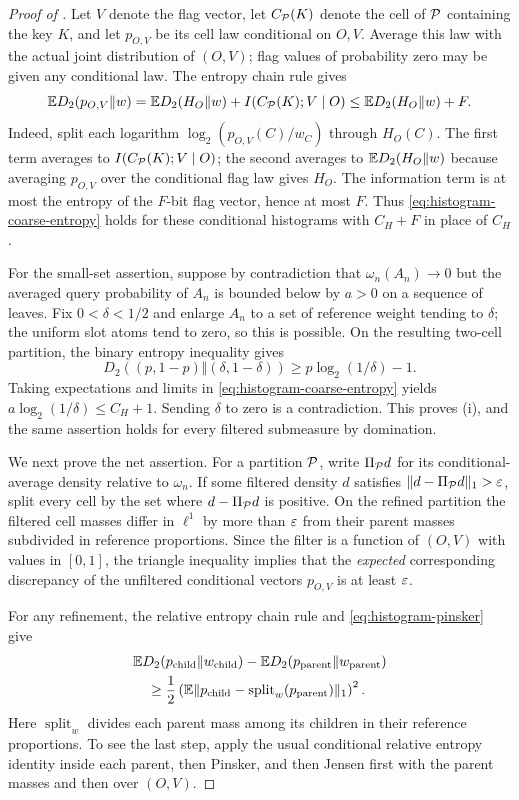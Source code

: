 \begin{proof}[Proof of ]
Let $V$ denote the flag vector, let $C_{\mathcal P}(K)$ denote the cell of
$\mathcal P$ containing the key $K$, and let $p_{O,V}$ be its cell law
conditional on $O,V$. Average this law with the actual joint
distribution of $(O,V)$; flag values of probability zero may be given
any conditional law. The entropy chain rule gives
\[
 \mathbb E D_2(p_{O,V}\Vert w)
 =\mathbb E D_2(H_O\Vert w)+I(C_{\mathcal P}(K);V\mid O)
 \le\mathbb E D_2(H_O\Vert w)+F.
\]
Indeed, split each logarithm $\log_2(p_{O,V}(C)/w_C)$ through
$H_O(C)$. The first term averages to $I(C_{\mathcal P}(K);V\mid O)$; the second
averages to $\mathbb E D_2(H_O\Vert w)$ because averaging $p_{O,V}$ over
the conditional flag law gives $H_O$. The information term is at
most the entropy of the $F$-bit flag vector, hence at most $F$.
Thus \eqref{eq:histogram-coarse-entropy} holds for these conditional
histograms with $C_H+F$ in place of $C_H$.

For the small-set assertion, suppose by contradiction that
$\omega_n(A_n)\to0$ but the averaged query probability of $A_n$ is
bounded below by $a>0$ on a sequence of leaves. Fix $0<\delta<1/2$ and
enlarge $A_n$ to a set of reference weight tending to $\delta$; the
uniform slot atoms tend to zero, so this is possible. On the resulting
two-cell partition, the binary entropy inequality gives
\[
 D_2((p,1-p)\Vert(\delta,1-\delta))
 \ge p\log_2(1/\delta)-1.
\]
Taking expectations and limits in
\eqref{eq:histogram-coarse-entropy} yields
$a\log_2(1/\delta)\le C_H+1$. Sending $\delta$ to zero is a
contradiction. This proves (i), and the same assertion holds for every
filtered submeasure by domination.

We next prove the net assertion. For a partition $\mathcal P$, write
$\Pi_{\mathcal P}d$ for its conditional-average density relative to
$\omega_n$. If some filtered density $d$ satisfies
$\lVert d-\Pi_{\mathcal P}d\rVert_1>\varepsilon$, split every cell by the set where
$d-\Pi_{\mathcal P}d$ is positive. On the refined partition the filtered cell
masses differ in $\ell^1$ by more than $\varepsilon$ from their parent masses
subdivided in reference proportions. Since the filter is a function
of $(O,V)$ with values in $[0,1]$, the triangle inequality implies that
the \emph{expected} corresponding discrepancy of the unfiltered
conditional vectors $p_{O,V}$ is at least $\varepsilon$.

For any refinement, the relative entropy chain rule and
\eqref{eq:histogram-pinsker} give
\begin{align}\label{eq:histogram-refinement-gain}
 &\mathbb E D_2(p_{\mathrm{child}}\Vert w_{\mathrm{child}})
 -\mathbb E D_2(p_{\mathrm{parent}}\Vert w_{\mathrm{parent}})\notag\\
 &\quad\ge \frac12
 \left(\mathbb E\lVert p_{\mathrm{child}}-
    \operatorname{split}_{w}(p_{\mathrm{parent}})\rVert_1\right)^2.
\end{align}
Here $\operatorname{split}_{w}$ divides each parent mass among its
children in their reference proportions. To see the last step, apply
the usual conditional relative entropy identity inside each parent,
then Pinsker, and then Jensen first with the parent masses and then
over $(O,V)$.


\end{proof}

